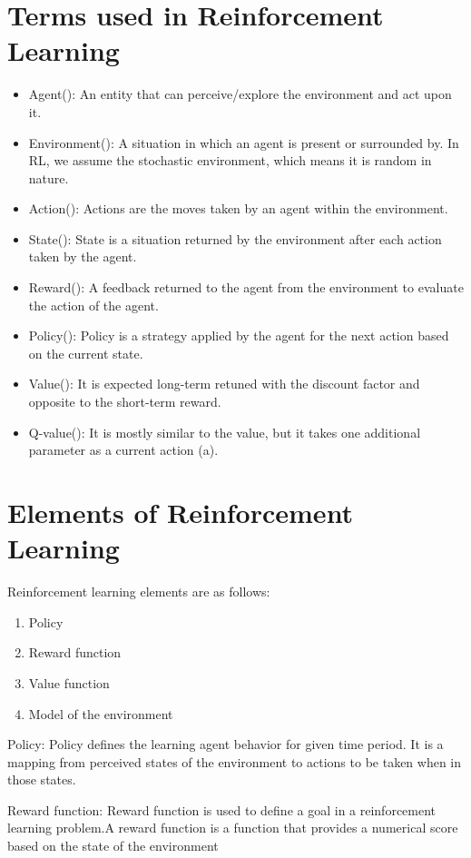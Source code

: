 \documentclass[12pt,a4paper]{report}
\begin{document}
\section*{Terms used in Reinforcement Learning}
\begin{itemize}
    \item Agent(): An entity that can perceive/explore the environment and act upon it.
    \item Environment(): A situation in which an agent is present or surrounded by. In RL, we assume the stochastic environment, which means it is random in nature.
    \item Action(): Actions are the moves taken by an agent within the environment.
    \item State(): State is a situation returned by the environment after each action taken by the agent.
    \item Reward(): A feedback returned to the agent from the environment to evaluate the action of the agent.
    \item Policy(): Policy is a strategy applied by the agent for the next action based on the current state.
    \item Value(): It is expected long-term retuned with the discount factor and opposite to the short-term reward.
    \item Q-value(): It is mostly similar to the value, but it takes one additional parameter as a current action (a).

\end{itemize}

\section*{Elements of Reinforcement Learning}
Reinforcement learning elements are as follows:
\begin{enumerate}
    \item Policy
    \item Reward function
    \item Value function
    \item Model of the environment
\end{enumerate}

Policy: Policy defines the learning agent behavior for given time period. It is a mapping from perceived states of the environment to actions to be taken when in those states.

Reward function: Reward function is used to define a goal in a reinforcement learning problem.A reward function is a function that provides a numerical score based on the state of the environment
\end{document}
